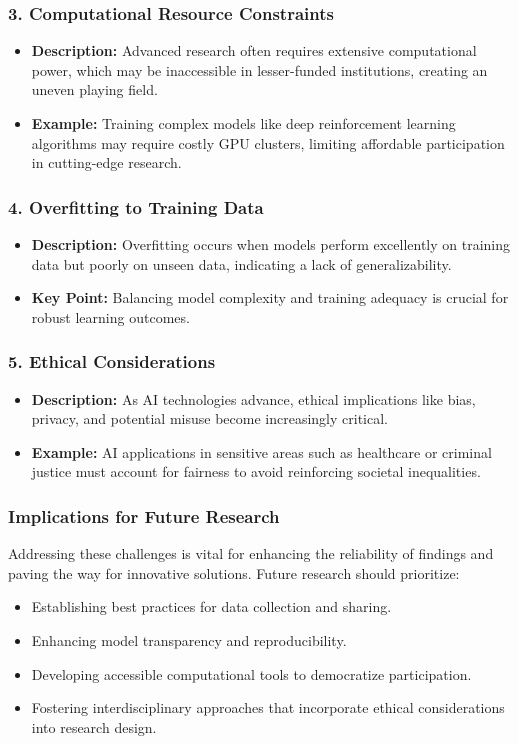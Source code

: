 \documentclass[aspectratio=169]{beamer}
\begin{document}
\begin{frame}[fragile]
    \frametitle{3. Computational Resource Constraints}
    \begin{itemize}
        \item \textbf{Description:} Advanced research often requires extensive computational power, which may be inaccessible in lesser-funded institutions, creating an uneven playing field.
        \item \textbf{Example:} Training complex models like deep reinforcement learning algorithms may require costly GPU clusters, limiting affordable participation in cutting-edge research.
    \end{itemize}
\end{frame}

\begin{frame}[fragile]
    \frametitle{4. Overfitting to Training Data}
    \begin{itemize}
        \item \textbf{Description:} Overfitting occurs when models perform excellently on training data but poorly on unseen data, indicating a lack of generalizability.
        \item \textbf{Key Point:} Balancing model complexity and training adequacy is crucial for robust learning outcomes.
    \end{itemize}
\end{frame}

\begin{frame}[fragile]
    \frametitle{5. Ethical Considerations}
    \begin{itemize}
        \item \textbf{Description:} As AI technologies advance, ethical implications like bias, privacy, and potential misuse become increasingly critical.
        \item \textbf{Example:} AI applications in sensitive areas such as healthcare or criminal justice must account for fairness to avoid reinforcing societal inequalities.
    \end{itemize}
\end{frame}

\begin{frame}[fragile]
    \frametitle{Implications for Future Research}
    Addressing these challenges is vital for enhancing the reliability of findings and paving the way for innovative solutions. Future research should prioritize:
    \begin{itemize}
        \item Establishing best practices for data collection and sharing.
        \item Enhancing model transparency and reproducibility.
        \item Developing accessible computational tools to democratize participation.
        \item Fostering interdisciplinary approaches that incorporate ethical considerations into research design.
    \end{itemize}
\end{frame}
\end{document}
